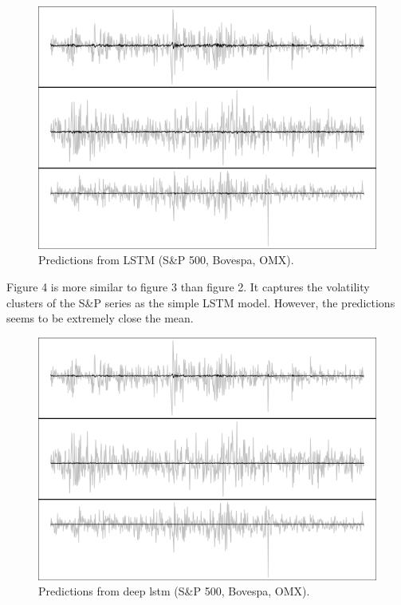 \documentclass[12pt, letterpaper]{amsart}%
\begin{document}
\begin{figure}[H]
\caption{Predictions from LSTM (S\&P 500, Bovespa, OMX).}
\centering
\includegraphics[scale=0.5]{lstm_pred.png}
\end{figure}

Figure 4 is more similar to figure 3 than figure 2. It captures the volatility clusters of the S\&P series as the simple LSTM model. However, the predictions seems to be extremely close the mean.
\\

\begin{figure}[H]
\caption{Predictions from deep lstm (S\&P 500, Bovespa, OMX).}
\centering
\includegraphics[scale=0.5]{lstm_deep_pred.png}
\end{figure}
\end{document}

